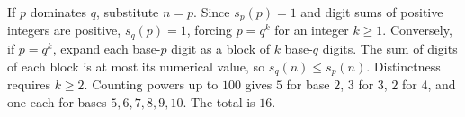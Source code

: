 If $p$ dominates $q$, substitute $n=p$. Since $s_p(p)=1$ and digit sums of positive integers are positive, $s_q(p)=1$, forcing $p=q^k$ for an integer $k\ge1$. Conversely, if $p=q^k$, expand each base-$p$ digit as a block of $k$ base-$q$ digits. The sum of digits of each block is at most its numerical value, so $s_q(n)\le s_p(n)$. Distinctness requires $k\ge2$. Counting powers up to $100$ gives $5$ for base $2$, $3$ for $3$, $2$ for $4$, and one each for bases $5,6,7,8,9,10$. The total is $\boxed{16}$.
